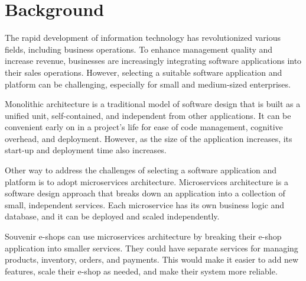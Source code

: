\section{Background}
The rapid development of information technology has revolutionized various fields, including business operations. To enhance management quality and increase revenue, businesses are increasingly integrating software applications into their sales operations. However, selecting a suitable software application and platform can be challenging, especially for small and medium-sized enterprises.

Monolithic architecture is a traditional model of software design that is built as a unified unit, self-contained, and independent from other applications. It can be convenient early on in a project's life for ease of code management, cognitive overhead, and deployment. However, as the size of the application increases, its start-up and deployment time also increases.

Other way to address the challenges of selecting a software application and platform is to adopt microservices architecture. Microservices architecture is a software design approach that breaks down an application into a collection of small, independent services. Each microservice has its own business logic and database, and it can be deployed and scaled independently.

Souvenir e-shops can use microservices architecture by breaking their e-shop application into smaller services. They could have separate services for managing products, inventory, orders, and payments. This would make it easier to add new features, scale their e-shop as needed, and make their system more reliable.
